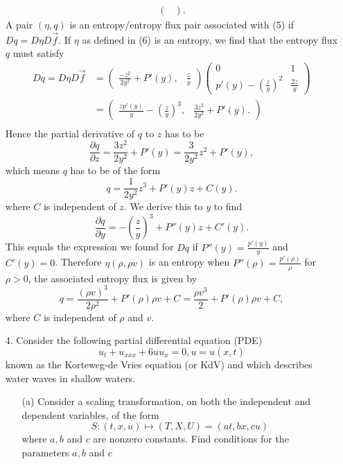 \documentclass[]{report}
\begin{document}
\begin{itemize}
\begin{align*}
\begin{pmatrix}
	\end{pmatrix}.
	\end{align*}
	A pair $(\eta,q)$ is an entropy/entropy flux pair associated with (5) if $Dq=D\eta D\vec{f}$.
	If $\eta$ as defined in (6) is an entropy, we find that the entropy flux $q$ must satisfy
	\begin{align*}
			Dq=D\eta D\vec{f}&=\begin{pmatrix}
			\frac{-z^2}{2y^2} + P'(y)	,& \frac{z}{y}
			\end{pmatrix} \begin{pmatrix}
		0	& 1\\
		p'(y) - (\frac{z}{y})^2	& \frac{2z}{y}
		\end{pmatrix}\\
		&=\begin{pmatrix}
		\frac{zp'(y)}{y} - (\frac{z}{y})^3	,& \frac{3z^2}{2y^2}+P'(y).
		\end{pmatrix}\\
	\end{align*}
	Hence the partial derivative of $q$ to $z$ has to be
	\[\frac{\partial q}{\partial z} = \frac{3z^2}{2y^2}+P'(y) = \frac{3}{2y^2} z^2 + P'(y),\]
	which means $q$ has to be of the form
	\[q=\frac{1}{2y^2}z^3+P'(y)z + C(y).\]
	where $C$ is independent of $z$. We derive this to $y$ to find
	\[\frac{\partial q}{\partial y} = -\left(\frac{z}{y}\right)^3 + P''(y)z + C'(y). \]
	This equals the expression we found for $Dq$ if $P''(y) = \frac{p'(y)}{y}$ and $C'(y)=0$. Therefore $\eta(\rho, \rho v)$ is an entropy when $P''(\rho) = \frac{p'(\rho)}{\rho}$ for $\rho>0$, the associated entropy flux is given by 
	\[q=\frac{(\rho v)^3}{2\rho^2}+P'(\rho)\rho v + C = \frac{\rho v^3}{2} + P'(\rho)\rho v + C,\]
	where $C$ is independent of $\rho$ and $v$.
	\newpage
	\item[4.]
	Consider the following partial differential equation (PDE)
	\begin{equation}
	u_t + u_{xxx} + 6uu_x = 0, u = u(x, t)
	\end{equation}
	known as the Korteweg-de Vries equation (or KdV) and which describes water waves in shallow waters.
	\begin{itemize}
		\item[(a)] Consider a scaling transformation, on both the independent and dependent
		variables, of the form
		\begin{equation}
		S : (t, x, u) \mapsto (T, X, U) = (at, bx, cu)
		\end{equation}
		where $a, b$ and $c$ are nonzero constants. Find conditions for the parameters $a, b$ and $c$

\end{itemize}
\end{itemize}
\end{document}
